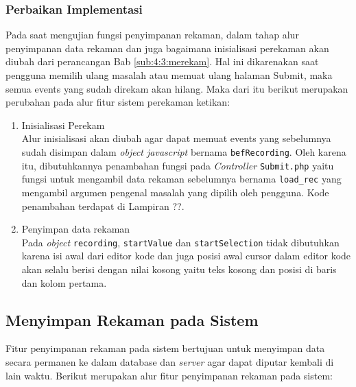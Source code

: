 \subsubsection{Perbaikan Implementasi}

Pada saat mengujian fungsi penyimpanan rekaman, dalam tahap alur penyimpanan data rekaman dan juga bagaimana inisialisasi perekaman akan diubah dari perancangan Bab \ref{sub:4:3:merekam}. Hal ini dikarenakan saat pengguna memilih ulang masalah atau memuat ulang halaman Submit, maka semua events yang sudah direkam akan hilang. Maka dari itu berikut merupakan perubahan pada alur fitur sistem perekaman ketikan:

\begin{enumerate}
    \item Inisialisasi Perekam \\
    Alur inisialisasi akan diubah agar dapat memuat events yang sebelumnya sudah disimpan dalam \textit{object javascript} bernama \verb|befRecording|. Oleh karena itu, dibutuhkannya penambahan fungsi pada \textit{Controller} \verb|Submit.php| yaitu fungsi untuk mengambil data rekaman sebelumnya bernama \verb|load_rec| yang mengambil argumen pengenal masalah yang dipilih oleh pengguna. Kode penambahan terdapat di Lampiran ??.
    \item Penyimpan data rekaman \\
    Pada \textit{object} \verb|recording|, \verb|startValue| dan \verb|startSelection| tidak dibutuhkan karena isi awal dari editor kode dan juga posisi awal cursor dalam editor kode akan selalu berisi dengan nilai kosong yaitu teks kosong dan posisi di baris dan kolom pertama.
\end{enumerate}

\subsection{Menyimpan Rekaman pada Sistem}
\label{sub:5:2:storerekaman}

Fitur penyimpanan rekaman pada sistem bertujuan untuk menyimpan data secara permanen ke dalam database dan \textit{server} agar dapat diputar kembali di lain waktu. Berikut merupakan alur fitur penyimpanan rekaman pada sistem:

